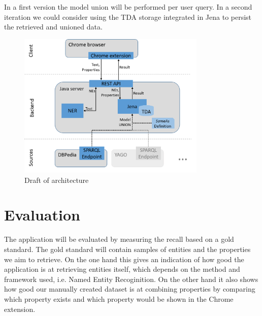 \documentclass[11pt,titlepage,oneside,openany]{article}
\begin{document}
In a first version the model union will be performed per user query. In a second
iteration we could consider using the TDA storage integrated in
Jena to persist the retrieved and unioned data.

\begin{figure}[ht]
	\centering
	\includegraphics[width=0.8\textwidth]{architecture}
	\caption{Draft of architecture}
	\label{fig:architecture}
\end{figure}


\section{Evaluation}
The application will be evaluated by measuring the recall based on a gold
standard. The gold standard will contain samples of entities and the properties
we aim to retrieve. On the one hand this gives an indication of how good the
application is at retrieving entities itself, which depends on the method and
framework used, i.e. Named Entity Recoginition. On the other hand it also shows
how good our manually created dataset is at combining properties by comparing
which property exists and which property would be shown in the Chrome extension.
\end{document}
